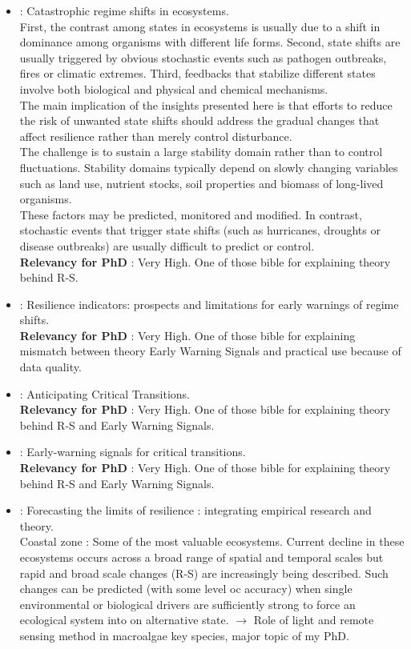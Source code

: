 \documentclass[]{report}
\begin{document}
\begin{itemize}
		
		\item \cite{scheffer2001catastrophic} : Catastrophic regime shifts in ecosystems.
		\\First, the contrast among states in ecosystems is usually due to a shift in dominance among organisms with different life forms.
		Second, state shifts are usually triggered by obvious stochastic events such as pathogen outbreaks, fires or climatic extremes.
		Third, feedbacks that stabilize different states involve both biological and physical and chemical mechanisms.
		\\The main implication of the insights presented here is that efforts to reduce the risk of unwanted state shifts should address the gradual changes that affect resilience rather than merely control disturbance.
		\\ The challenge is to sustain a large stability domain rather than to 	control fluctuations. Stability domains typically depend on slowly changing variables such as land use, nutrient stocks, soil
		properties and biomass of long-lived organisms.
		\\These factors may be predicted, monitored and modified. In contrast, stochastic events that trigger state shifts (such as hurricanes, droughts or disease outbreaks) are usually difficult to predict or control.
		\\\textbf{Relevancy for PhD} : Very High. One of those bible for explaining theory behind R-S.
		\item \cite{dakos2015resilience} : Resilience indicators: prospects and limitations for early warnings of regime shifts.
		\\\textbf{Relevancy for PhD} : Very High. One of those bible for explaining mismatch between theory Early Warning Signals and practical use because of data quality.
		\item \cite{scheffer2012anticipating} : Anticipating Critical Transitions.
		\\\textbf{Relevancy for PhD} : Very High. One of those bible for explaining theory behind R-S and Early Warning Signals.
		\item \cite{scheffer2009early} : Early-warning signals for critical transitions.
		\\\textbf{Relevancy for PhD} : Very High. One of those bible for explaining theory behind R-S and Early Warning Signals.
		\item \cite{thrush2009forecasting} : Forecasting the limits of resilience : integrating empirical research and theory.
		\\ Coastal zone : Some of the most valuable ecosystems. Current decline in these ecosystems occurs across a broad range of spatial and temporal scales but rapid and broad scale changes (R-S) are increasingly being described. Such changes can be predicted (with some level oc accuracy) when single environmental or biological drivers are sufficiently strong to force an ecological system into on alternative state. $\rightarrow$ Role of light and remote sensing method in macroalgae key species, major topic of my PhD.

\end{itemize}
\end{document}
